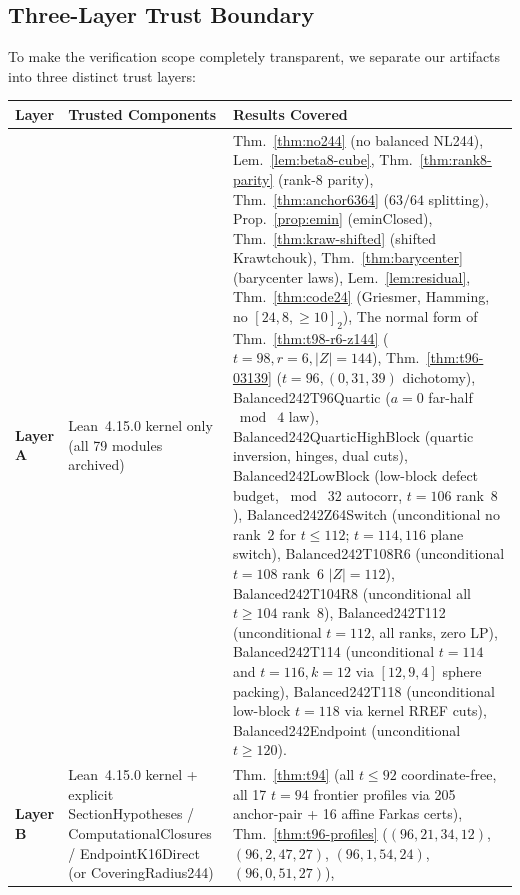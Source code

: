 \documentclass[11pt]{article}
\theoremstyle{definition}
\newcommand{\code}[1]{{\ttfamily\small\renewcommand{\_}{\textunderscore\allowbreak}#1}}
\begin{document}
\subsection{Three-Layer Trust Boundary}

To make the verification scope completely transparent, we separate our artifacts into three distinct trust layers:

\begin{table}[ht]
\centering
\small
\begin{tabular}{@{}>{\raggedright\arraybackslash}l>{\raggedright\arraybackslash}p{4.3cm}>{\raggedright\arraybackslash}p{9.2cm}@{}}
\toprule
\textbf{Layer} & \textbf{Trusted Components} & \textbf{Results Covered} \\
\midrule
\textbf{Layer A} & Lean~4.15.0 kernel only (all 79 modules archived) &
  Thm.~\ref{thm:no244} (no balanced NL244),
  Lem.~\ref{lem:beta8-cube},
  Thm.~\ref{thm:rank8-parity} (rank-$8$ parity),
  Thm.~\ref{thm:anchor6364} ($63/64$ splitting),
  Prop.~\ref{prop:emin} (\code{eminClosed}),
  Thm.~\ref{thm:kraw-shifted} (shifted Krawtchouk),
  Thm.~\ref{thm:barycenter} (barycenter laws),
  Lem.~\ref{lem:residual},
  Thm.~\ref{thm:code24} (Griesmer, Hamming, no $[24,8,\ge 10]_2$),
  The normal form of Thm.~\ref{thm:t98-r6-z144} ($t=98, r=6, |Z|=144$),
  Thm.~\ref{thm:t96-03139} ($t=96, (0,31,39)$ dichotomy),
  \code{Balanced242T96Quartic} ($a=0$ far-half $\bmod\;4$ law),
  \code{Balanced242QuarticHighBlock} (quartic inversion, hinges, dual cuts),
  \code{Balanced242LowBlock} (low-block defect budget, $\bmod\;32$ autocorr, $t=106$ rank~$8$),
  \code{Balanced242Z64Switch} (unconditional no rank~$2$ for $t \le 112$; $t=114,116$ plane switch),
  \code{Balanced242T108R6} (unconditional $t=108$ rank~$6$ $|Z|=112$),
  \code{Balanced242T104R8} (unconditional all $t \ge 104$ rank~$8$),
  \code{Balanced242T112} (unconditional $t = 112$, all ranks, zero LP),
  \code{Balanced242T114} (unconditional $t = 114$ and $t = 116, k = 12$ via $[12,9,4]$ sphere packing),
  \code{Balanced242T118} (unconditional low-block $t = 118$ via kernel RREF cuts),
  \code{Balanced242Endpoint} (unconditional $t \ge 120$). \\
\midrule
\textbf{Layer B} & Lean~4.15.0 kernel + explicit \code{SectionHypotheses} / \code{ComputationalClosures} / \code{EndpointK16Direct} (or \code{CoveringRadius244}) &
  Thm.~\ref{thm:t94} (all $t \le 92$ coordinate-free, all 17 $t=94$ frontier profiles via 205 anchor-pair + 16 affine Farkas certs),
  Thm.~\ref{thm:t96-profiles} ($(96,21,34,12)$, $(96,2,47,27)$, $(96,1,54,24)$, $(96,0,51,27)$),

\end{tabular}
\end{table}
\end{document}
